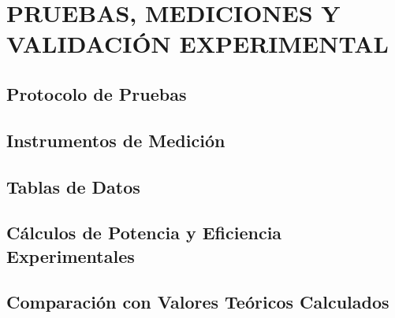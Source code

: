 \section{PRUEBAS, MEDICIONES Y VALIDACIÓN EXPERIMENTAL}

\subsection{Protocolo de Pruebas}

\subsection{Instrumentos de Medición}

\subsection{Tablas de Datos}

\subsection{Cálculos de Potencia y Eficiencia Experimentales}

\subsection{Comparación con Valores Teóricos Calculados}